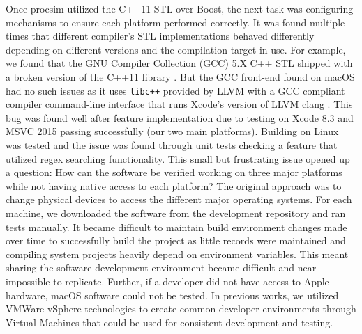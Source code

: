 Once procsim utilized the C++11 STL over Boost, the next task was configuring mechanisms to ensure each platform performed correctly. It was found multiple times that different compiler's STL implementations behaved differently depending on different versions and the compilation target in use. For example, we found that the GNU Compiler Collection (GCC) \cite{GCC} 5.X C++ STL shipped with a broken version of the C++11  library \cite{StackOverflow:GCCRegex}. But the GCC front-end found on macOS had no such issues as it uses \texttt{libc++} provided by LLVM with a GCC compliant compiler command-line interface that runs Xcode's version of LLVM clang \cite{Apple:Developer:CommandLineTools}. This bug was found well after feature implementation due to testing on Xcode 8.3 and MSVC 2015 passing successfully (our two main platforms). Building on Linux was tested and the issue was found through unit tests checking a feature that utilized regex searching functionality. This small but frustrating issue opened up a question: How can the software be verified working on three major platforms while not having native access to each platform? The original approach was to change physical devices to access the different major operating systems. For each machine, we downloaded the software from the development repository and ran tests manually. It became difficult to maintain build environment changes made over time to successfully build the project as little records were maintained and compiling system projects heavily depend on environment variables. This meant sharing the software development environment became difficult and near impossible to replicate. Further, if a developer did not have access to Apple hardware, macOS software could not be tested. In previous works, we utilized VMWare vSphere \cite{VMWare:vSphere} technologies to create common developer environments through Virtual Machines that could be used for consistent development and testing. 

